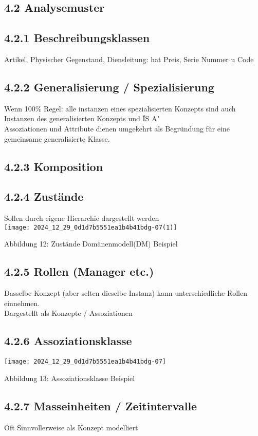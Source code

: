 \subsection*{4.2 Analysemuster}
\subsection*{4.2.1 Beschreibungsklassen}
Artikel, Physischer Gegenstand, Diensleitung: hat Preis, Serie Nummer u Code

\subsection*{4.2.2 Generalisierung / Spezialisierung}
Wenn 100\% Regel: alle instanzen eines spezialisierten Konzepts sind auch Instanzen des generalisierten Konzepts und ÏS A"\\
Assoziationen und Attribute dienen umgekehrt als Begründung für eine gemeinsame generalisierte Klasse.

\subsection*{4.2.3 Komposition}
\subsection*{4.2.4 Zustände}
Sollen durch eigene Hierarchie dargestellt werden\\
\texttt{[image: 2024\_12\_29\_0d1d7b5551ea1b4b41bdg-07(1)]}

Abbildung 12: Zustände Domänenmodell(DM) Beispiel

\subsection*{4.2.5 Rollen (Manager etc.)}
Dasselbe Konzept (aber selten dieselbe Instanz) kann unterschiedliche Rollen einnehmen.\\
Dargestellt als Konzepte / Assoziationen

\subsection*{4.2.6 Assoziationsklasse}
\begin{center}
\texttt{[image: 2024\_12\_29\_0d1d7b5551ea1b4b41bdg-07]}
\end{center}

Abbildung 13: Assoziationsklasse Beispiel

\subsection*{4.2.7 Masseinheiten / Zeitintervalle}
Oft Sinnvollerweise als Konzept modelliert